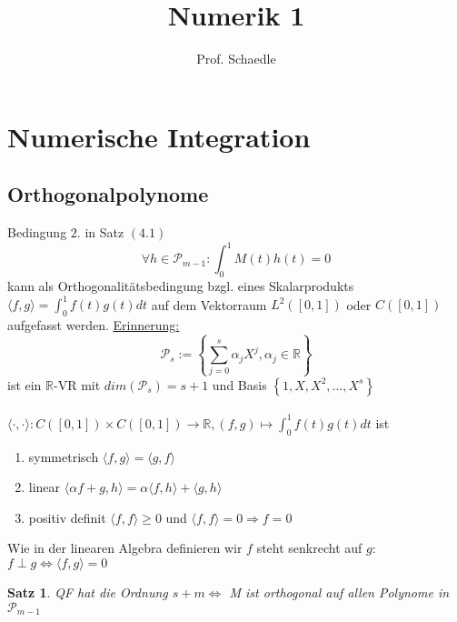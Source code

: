 \documentclass[12pt]{article}
\author{Prof. Schaedle}
\title{Numerik 1}
\theoremstyle{break}
\newtheorem{theorem}{Satz}[subsection]
\begin{document}
\maketitle

\newpage

\section{Numerische Integration}



\subsection{Orthogonalpolynome}
Bedingung $2.$ in Satz $(4.1)$ 
$$ \forall h \in \mathcal{P}_{m-1}: \int_0^1 M(t)h(t) = 0$$
kann als Orthogonalitätsbedingung bzgl. eines Skalarprodukts $\langle f, g\rangle = \int_0^1 f(t)g(t)dt$ auf dem Vektorraum $L^2([0,1])$ oder $C([0,1])$ aufgefasst werden.
\underline{Erinnerung:}
$$\mathcal{P}_s := \left\{ \sum_{j=0}^s \alpha_j X^j, \alpha_j \in \mathbb{R} \right\}$$ 
ist ein $\mathbb{R}$-VR mit $dim(\mathcal{P}_s) = s+1$ und Basis $\left\{ 1, X, X^2, ..., X^s \right\}$\\ \\
$\langle\cdot,\cdot\rangle : C([0,1]) \times C([0,1]) \rightarrow \mathbb{R}, (f, g) \mapsto \int_0^1 f(t)g(t)dt$ ist 
\begin{enumerate}
  \item symmetrisch $ \langle f, g\rangle = \langle g, f\rangle$
  \item linear $\langle \alpha f + g, h\rangle = \alpha \langle f, h\rangle + \langle g, h\rangle$
  \item positiv definit $\langle f, f\rangle \geq 0 $ und $ \langle f, f\rangle = 0 \Rightarrow f = 0$
\end{enumerate}
Wie in der linearen Algebra definieren wir $f$ steht senkrecht auf $g$: $f \perp g \Leftrightarrow \langle f, g\rangle = 0$

\begin{theorem}
QF hat die Ordnung $s+m \Leftrightarrow $ M ist orthogonal auf allen Polynome in $\mathcal{P}_{m-1}$
\end{theorem}
\end{document}
